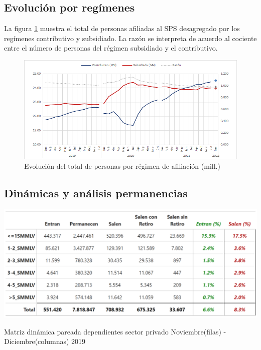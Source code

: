 \subsection{Evolución por regímenes}
La figura \ref{fig:anexo:regimenes} muestra el total de personas afiliadas al SPS desagregado por los regímenes contributivo y subsidiado. La razón se interpreta de acuerdo al cociente entre el número de personas del régimen subsidiado y el contributivo. 

\begin{figure}[!htbp]
    \centering
    \includegraphics[width = 13cm]{figures/anexo_tecnico/contributivo_subsidiado_regimenes.png}
    \caption{Evolución del total de personas por régimen de afiliación (mill.)}
    \label{fig:anexo:regimenes}
\end{figure}

\FloatBarrier
\subsection{Dinámicas y análisis permanencias}

\begin{table}[!h]
\centering
\includegraphics[width = 15cm]{results/02_longitudinal/salida_resumen_dependientes_interes_19.png}
\caption{Matriz dinámica pareada dependientes sector privado Noviembre(filas) - Diciembre(columnas) 2019}%
\label{tabla:sector_privado:matriz_dinamica_mes_interes_19}
\end{table}

